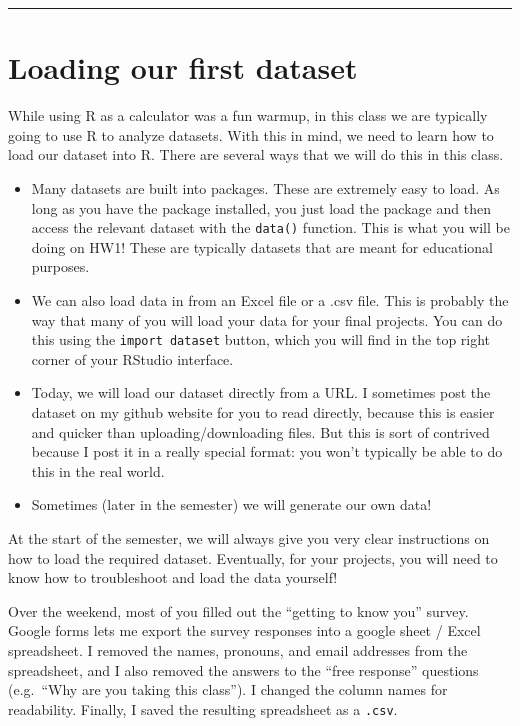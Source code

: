 \documentclass[
]{article}
\providecommand{\tightlist}{%
  \setlength{\itemsep}{0pt}\setlength{\parskip}{0pt}}
\begin{document}
\begin{center}\rule{0.5\linewidth}{0.5pt}\end{center}

\section{Loading our first dataset}\label{loading-our-first-dataset}

While using R as a calculator was a fun warmup, in this class we are
typically going to use R to analyze datasets. With this in mind, we need
to learn how to load our dataset into R. There are several ways that we
will do this in this class.

\begin{itemize}
\tightlist
\item
  Many datasets are built into packages. These are extremely easy to
  load. As long as you have the package installed, you just load the
  package and then access the relevant dataset with the \texttt{data()}
  function. This is what you will be doing on HW1! These are typically
  datasets that are meant for educational purposes.
\item
  We can also load data in from an Excel file or a .csv file. This is
  probably the way that many of you will load your data for your final
  projects. You can do this using the \texttt{import\ dataset} button,
  which you will find in the top right corner of your RStudio interface.
\item
  Today, we will load our dataset directly from a URL. I sometimes post
  the dataset on my github website for you to read directly, because
  this is easier and quicker than uploading/downloading files. But this
  is sort of contrived because I post it in a really special format: you
  won't typically be able to do this in the real world.
\item
  Sometimes (later in the semester) we will generate our own data!
\end{itemize}

At the start of the semester, we will always give you very clear
instructions on how to load the required dataset. Eventually, for your
projects, you will need to know how to troubleshoot and load the data
yourself!

Over the weekend, most of you filled out the ``getting to know you''
survey. Google forms lets me export the survey responses into a google
sheet / Excel spreadsheet. I removed the names, pronouns, and email
addresses from the spreadsheet, and I also removed the answers to the
``free response'' questions (e.g.~``Why are you taking this class''). I
changed the column names for readability. Finally, I saved the resulting
spreadsheet as a \texttt{.csv}.
\end{document}
